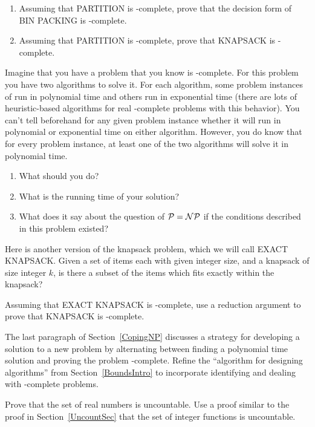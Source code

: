 \begin{exercises}
\begin{enumerate}
\item Assuming that PARTITION is \NP-complete, prove that the decision
form of BIN PACKING is \NP-complete.

\item Assuming that PARTITION is \NP-complete, prove that KNAPSACK is
\NP-complete.
\end{enumerate}

\item
Imagine that you have a problem  that you know is \NP-complete.
For this problem you have two algorithms to solve it.
For each algorithm, some problem instances of  run in
polynomial time and others run in exponential time (there are lots of
heuristic-based algorithms for real \NP-complete problems with this behavior).
You can't tell beforehand for any given problem instance whether it
will run in polynomial or exponential time on either algorithm.
However, you do know that for every problem instance, at least one of
the two algorithms will solve it in polynomial time.

\begin{enumerate}
\item What should you do?
\item What is the running time of your solution?
\item What does it say about the question of \(\mbox{${\cal P}$} = \mbox{${\cal NP}$}\) if the
conditions described in this problem existed?
\end{enumerate}

\item
Here is another version of the knapsack problem, which we will call
EXACT KNAPSACK.
Given a set of items each with given integer size, and a
knapsack of size integer $k$, is there a subset of the items which
fits exactly within the knapsack?

Assuming that EXACT KNAPSACK is \NP-complete,
use a reduction argument to prove that KNAPSACK is \NP-complete.

\item
The last paragraph of Section~\ref{CopingNP} discusses a strategy for
developing a solution to a new problem by alternating between finding
a polynomial time solution and proving the problem \NP-complete.
Refine the ``algorithm for designing algorithms'' from
Section~\ref{BoundsIntro} to incorporate identifying and dealing with
\NP-complete problems.

\item
Prove that the set of real numbers is uncountable.
Use a proof similar to the proof in Section~\ref{UncountSec}
that the set of integer functions is uncountable.


\end{exercises}
